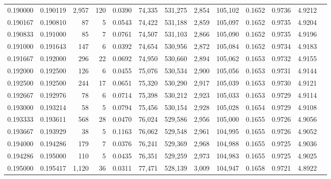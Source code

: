 \begin{tabular}{rrrrrrrrrrrrr}
0.190000 & 0.190119 & 2,957 & 120 &                                     0.0390 &  74,335 & 531,275 &   2,854 & 105,102 & 0.1652 & 0.9736 & 4.9212 \\
0.190167 & 0.190810 &    87 &   5 &                                     0.0543 &  74,422 & 531,188 &   2,859 & 105,097 & 0.1652 & 0.9735 & 4.9204 \\
0.190833 & 0.191000 &    85 &   7 &                                     0.0761 &  74,507 & 531,103 &   2,866 & 105,090 & 0.1652 & 0.9735 & 4.9196 \\
0.191000 & 0.191643 &   147 &   6 &                                     0.0392 &  74,654 & 530,956 &   2,872 & 105,084 & 0.1652 & 0.9734 & 4.9183 \\
0.191667 & 0.192000 &   296 &  22 &                                     0.0692 &  74,950 & 530,660 &   2,894 & 105,062 & 0.1653 & 0.9732 & 4.9155 \\
0.192000 & 0.192500 &   126 &   6 &                                     0.0455 &  75,076 & 530,534 &   2,900 & 105,056 & 0.1653 & 0.9731 & 4.9144 \\
0.192500 & 0.192500 &   244 &  17 &                                     0.0651 &  75,320 & 530,290 &   2,917 & 105,039 & 0.1653 & 0.9730 & 4.9121 \\
0.192667 & 0.192976 &    78 &   6 &                                     0.0714 &  75,398 & 530,212 &   2,923 & 105,033 & 0.1653 & 0.9729 & 4.9114 \\
0.193000 & 0.193214 &    58 &   5 &                                     0.0794 &  75,456 & 530,154 &   2,928 & 105,028 & 0.1654 & 0.9729 & 4.9108 \\
0.193333 & 0.193611 &   568 &  28 &                                     0.0470 &  76,024 & 529,586 &   2,956 & 105,000 & 0.1655 & 0.9726 & 4.9056 \\
0.193667 & 0.193929 &    38 &   5 &                                     0.1163 &  76,062 & 529,548 &   2,961 & 104,995 & 0.1655 & 0.9726 & 4.9052 \\
0.194000 & 0.194286 &   179 &   7 &                                     0.0376 &  76,241 & 529,369 &   2,968 & 104,988 & 0.1655 & 0.9725 & 4.9036 \\
0.194286 & 0.195000 &   110 &   5 &                                     0.0435 &  76,351 & 529,259 &   2,973 & 104,983 & 0.1655 & 0.9725 & 4.9025 \\
0.195000 & 0.195417 & 1,120 &  36 &                                     0.0311 &  77,471 & 528,139 &   3,009 & 104,947 & 0.1658 & 0.9721 & 4.8922 \\

\end{tabular}
